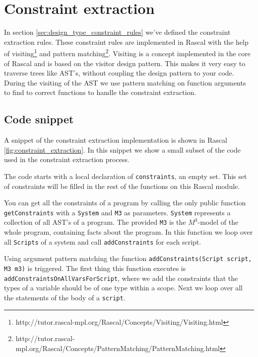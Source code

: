 \documentclass[../main.tex]{subfiles}
\begin{document}
    \section{Constraint extraction}\label{sec:implementation:constraint_extraction}
    In section \ref{sec:design_type_constraint_rules} we've defined the constraint extraction rules.
    These constraint rules are implemented in Rascal with the help of visiting\footnote{http://tutor.rascal-mpl.org/Rascal/Concepts/Visiting/Visiting.html} and pattern matching\footnote{http://tutor.rascal-mpl.org/Rascal/Concepts/PatternMatching/PatternMatching.html}.
    Visiting is a concept implemented in the core of Rascal and is based on the visitor design pattern.
    This makes it very easy to traverse trees like AST's, without coupling the design pattern to your code.
    During the visiting of the AST we use pattern matching on function arguments to find to correct functions to handle the constraint extraction. 
    
    \subsection{Code snippet}
    A snippet of the constraint extraction implementation\footnotemark{} is shown in Rascal \ref{fig:constraint_extraction}.
	In this snippet we show a small subset of the code used in the constraint extraction process.
	
	The code starts with a local declaration of \texttt{constraints}, an empty set.
	This set of constraints will be filled in the rest of the functions on this Rascal module.
	
	You can get all the constraints of a program by calling the only public function \texttt{getConstraints} with a \texttt{System} and \texttt{M3} as parameters.
	\texttt{System} represents a collection of all AST's of a program.
	The provided \texttt{M3} is the $M^3$-model of the whole program, containing facts about the program.
	In this function we loop over all \texttt{Scripts} of a system and call \texttt{addConstraints} for each script.
	
	Using argument pattern matching the function \texttt{addConstraints(Script script, M3 m3)} is triggered.
	The first thing this function executes is \texttt{addConstraintsOnAllVarsForScript}, where we add the constraints that the types of a variable should be of one type within a scope.
	Next we loop over all the statements of the body of a \texttt{script}.
	
\end{document}
